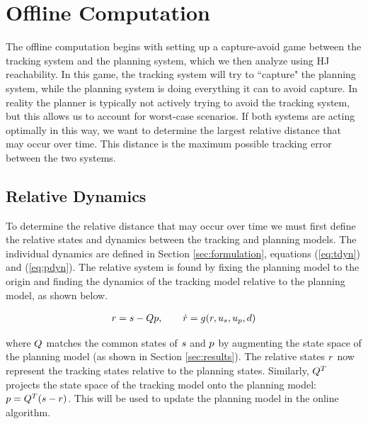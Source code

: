 \section{Offline Computation \label{sec:precomp}}
The offline computation begins with setting up a capture-avoid game \cite{Huang11, Chen17} between the tracking system and the planning system, which we then analyze using HJ reachability. In this game, the tracking system will try to ``capture" the planning system, while the planning system is doing everything it can to avoid capture. In reality the planner is typically not actively trying to avoid the tracking system, but this allows us to account for worst-case scenarios. If both systems are acting optimally in this way, we want to determine the largest relative distance that may occur over time. This distance is the maximum possible tracking error between the two systems.

\subsection{Relative Dynamics}
To determine the relative distance that may occur over time we must first define the relative states and dynamics between the tracking and planning models. The individual dynamics are defined in Section \ref{sec:formulation}, equations (\ref{eq:tdyn}) and (\ref{eq:pdyn}). The relative system is found by fixing the planning model to the origin and finding the dynamics of the tracking model relative to the planning model, as shown below.

\begin{equation}
\label{eq:rdyn}
\begin{aligned}
r = s - Qp, \qquad \dot{r} = g(r, u_s, u_p, d)
\end{aligned}
\end{equation}

where $Q$ matches the common states of $s$ and $p$ by augmenting the state space of the planning model (as shown in Section \ref{sec:results}). The relative states $r$ now represent the tracking states relative to the planning states. Similarly, $Q^T$ projects the state space of the tracking model onto the planning model: $p = Q^T(s-r)$. This will be used to update the planning model in the online algorithm.

